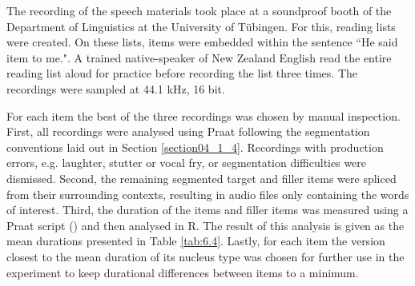 The recording of the speech materials took place at a soundproof booth of the Department of Linguistics at the University of Tübingen. For this, reading lists were created. On these lists, items were embedded within the sentence ``He said item to me.". A trained native-speaker of New Zealand English read the entire reading list aloud for practice before recording the list three times. The recordings were sampled at 44.1 kHz, 16 bit.

For each item the best of the three recordings was chosen by manual inspection. First, all recordings were analysed using Praat following the segmentation conventions laid out in Section \ref{section04_1_4}. Recordings with production errors, e.g. laughter, stutter or vocal fry, or segmentation difficulties were dismissed. Second, the remaining segmented target and filler items were spliced from their surrounding contexts, resulting in audio files only containing the words of interest. Third, the duration of the items and filler items was measured using a Praat script (\cite{deJong2008}) and then analysed in R. The result of this analysis is given as the mean durations presented in Table \ref{tab:6.4}. Lastly, for each item the version closest to the mean duration of its nucleus type was chosen for further use in the experiment to keep durational differences between items to a minimum.

